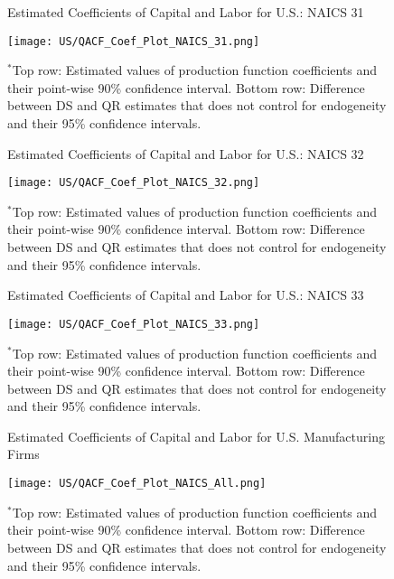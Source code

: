 \documentclass[12pt]{article}
\begin{document}
\begin{figure}[H]
\centering
\caption{Estimated Coefficients of Capital and Labor for U.S.: NAICS 31}
\texttt{[image: US/QACF\_Coef\_Plot\_NAICS\_31.png]}
\caption*{\footnotesize $^{*}$Top row: Estimated values of production function coefficients and their point-wise 90\% confidence interval. Bottom row: Difference between DS and QR estimates that does not control for endogeneity and their 95\% confidence intervals.}
\label{fig:QACFUS31}
\end{figure}

\begin{figure}[H]
\centering
\caption{Estimated Coefficients of Capital and Labor for U.S.: NAICS 32}
\texttt{[image: US/QACF\_Coef\_Plot\_NAICS\_32.png]}
\caption*{\footnotesize $^{*}$Top row: Estimated values of production function coefficients and their point-wise 90\% confidence interval. Bottom row: Difference between DS and QR estimates that does not control for endogeneity and their 95\% confidence intervals.}
\label{fig:QACFUS32}
\end{figure}

\begin{figure}[H]
\centering
\caption{Estimated Coefficients of Capital and Labor for U.S.: NAICS 33}
\texttt{[image: US/QACF\_Coef\_Plot\_NAICS\_33.png]}
\caption*{\footnotesize $^{*}$Top row: Estimated values of production function coefficients and their point-wise 90\% confidence interval. Bottom row: Difference between DS and QR estimates that does not control for endogeneity and their 95\% confidence intervals.}
\label{fig:QACFUS33}
\end{figure}

\begin{figure}[H]
\centering
\caption{Estimated Coefficients of Capital and Labor for U.S. Manufacturing Firms}
\texttt{[image: US/QACF\_Coef\_Plot\_NAICS\_All.png]}
\caption*{\footnotesize $^{*}$Top row: Estimated values of production function coefficients and their point-wise 90\% confidence interval. Bottom row: Difference between DS and QR estimates that does not control for endogeneity and their 95\% confidence intervals.}
\label{fig:QACFUSall}
\end{figure}
\end{document}
